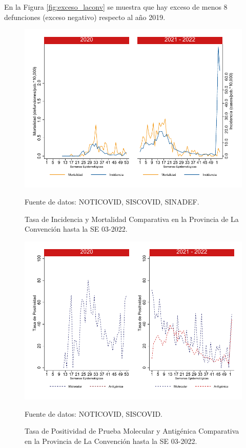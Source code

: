 \documentclass[12pt,a4paper,openany]{book}
\begin{document}
	En la Figura \ref{fig:exceso_laconv} se muestra que hay exceso de menos 8 defunciones (exceso negativo) respecto al año 2019.
		
		\begin{figure}[h]
			\caption{Tasa de Incidencia y Mortalidad Comparativa en la Provincia de La Convención hasta la SE 03-2022.}\label{fig:inc_mort_laconv}
			\begin{center}
				\includegraphics[width=0.7\linewidth]{../figuras/incidencia_mortalidad_20_21_9}
			\end{center}
			{\footnotesize {Fuente de datos: NOTICOVID, SISCOVID, SINADEF.}}
		\end{figure}
		
		\begin{figure}[h]
			\caption{Tasa de Positividad de Prueba Molecular y Antigénica Comparativa en la Provincia de La Convención hasta la SE 03-2022.}\label{fig:positividad_laconv}
			\begin{center}
				\includegraphics[width=0.7\linewidth]{../figuras/positividad_20_21_9}
			\end{center}
			{\footnotesize {Fuente de datos: NOTICOVID, SISCOVID.}}
		\end{figure}
		
\end{document}

